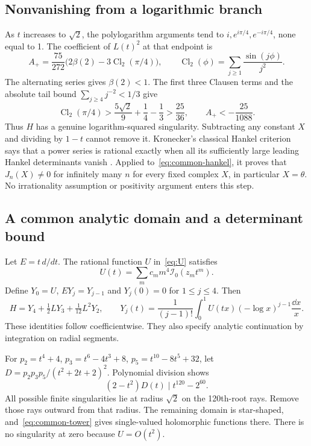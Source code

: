 \subsection{Nonvanishing from a logarithmic branch}
As $t$ increases to $\sqrt2$, the polylogarithm arguments tend to
$i,e^{i\pi/4},e^{-i\pi/4}$, none equal to 1. The coefficient of
$L(t)^2$ at that endpoint is
\[
 A_+=\frac{75}{272}\bigl(2\beta(2)-3\operatorname{Cl}_2(\pi/4)\bigr),
 \qquad \operatorname{Cl}_2(\phi)=\sum_{j\geq1}\frac{\sin(j\phi)}{j^2}.
\]
The alternating series gives $\beta(2)<1$. The first three Clausen
terms and the absolute tail bound $\sum_{j\geq4}j^{-2}<1/3$ give
\[
 \operatorname{Cl}_2(\pi/4)>
       \frac{5\sqrt2}{9}+\frac14-\frac13>\frac{25}{36},
 \qquad A_+<-\frac{25}{1088}.
\]
Thus $H$ has a genuine logarithm-squared singularity. Subtracting any
constant $X$ and dividing by $1-t$ cannot remove it. Kronecker's
classical Hankel criterion says that a power series is rational exactly
when all its sufficiently large leading Hankel determinants vanish
\cite[Theorem 1]{KroneckerNote}. Applied to~\eqref{eq:common-hankel},
it proves that $J_n(X)\ne0$ for infinitely many $n$ for every fixed
complex $X$, in particular $X=\theta$. No irrationality assumption or
positivity argument enters this step.

\subsection{A common analytic domain and a determinant bound}
Let $E=t\,d/dt$. The rational function $U$ in~\eqref{eq:U} satisfies
\[
 U(t)=\sum_m c_m m^4\mathcal I_0(z_mt^m).
\]
Define $Y_0=U$, $EY_j=Y_{j-1}$ and $Y_j(0)=0$ for $1\leq j\leq4$.
Then
\begin{equation}\label{eq:common-tower}
 H=Y_4+\tfrac12LY_3+\tfrac1{12}L^2Y_2,\qquad
 Y_j(t)=\frac1{(j-1)!}\int_0^1U(tx)(-\log x)^{j-1}\frac{\dd x}{x}.
\end{equation}
These identities follow coefficientwise. They also specify analytic
continuation by integration on radial segments.

For $p_2=t^4+4$, $p_3=t^6-4t^3+8$, $p_5=t^{10}-8t^5+32$,
let $D=p_2p_3p_5/(t^2+2t+2)^2$. Polynomial division shows
\[
 (2-t^2)D(t)\mid t^{120}-2^{60}.
\]
All possible finite singularities lie at radius $\sqrt2$ on the
120th-root rays. Remove those rays outward from that radius. The
remaining domain is star-shaped, and~\eqref{eq:common-tower} gives
single-valued holomorphic functions there. There is no singularity at
zero because $U=O(t^2)$.


